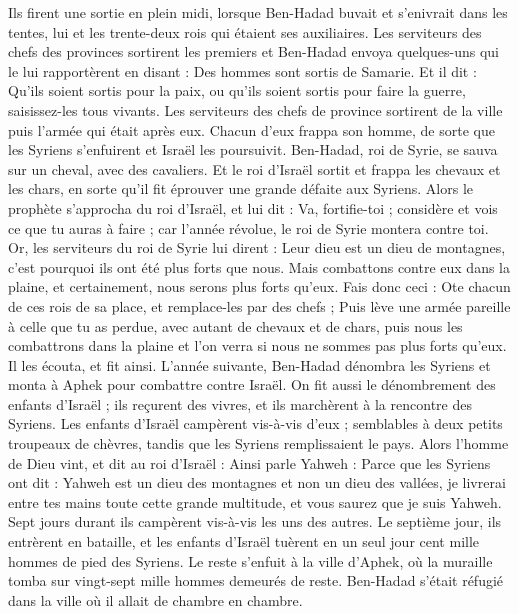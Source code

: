 \begin{multicols}{2}
Ils firent une sortie en plein midi, lorsque Ben-Hadad buvait et s'enivrait dans les tentes, lui et les trente-deux rois qui étaient ses auxiliaires.
Les serviteurs des chefs des provinces sortirent les premiers et Ben-Hadad envoya quelques-uns qui le lui rapportèrent en disant : Des hommes sont sortis de Samarie.
Et il dit : Qu’ils soient sortis pour la paix, ou qu'ils soient sortis pour faire la guerre, saisissez-les tous vivants.
Les serviteurs des chefs de province sortirent de la ville puis l'armée qui était après eux.
Chacun d'eux frappa son homme, de sorte que les Syriens s'enfuirent et Israël les poursuivit. Ben-Hadad, roi de Syrie, se sauva sur un cheval, avec des cavaliers.
Et le roi d'Israël sortit et frappa les chevaux et les chars, en sorte qu'il fit éprouver une grande défaite aux Syriens.
Alors le prophète s’approcha du roi d'Israël, et lui dit : Va, fortifie-toi ; considère et vois ce que tu auras à faire ; car l’année révolue, le roi de Syrie montera contre toi.
Or, les serviteurs du roi de Syrie lui dirent : Leur dieu est un dieu de montagnes, c'est pourquoi ils ont été plus forts que nous. Mais combattons contre eux dans la plaine, et certainement, nous serons plus forts qu'eux.
Fais donc ceci : Ote chacun de ces rois de sa place, et remplace-les par des chefs ;
Puis lève une armée pareille à celle que tu as perdue, avec autant de chevaux et de chars, puis nous les combattrons dans la plaine et l’on verra si nous ne sommes pas plus forts qu'eux. Il les écouta, et fit ainsi.
L’année suivante, Ben-Hadad dénombra les Syriens et monta à Aphek pour combattre contre Israël.
On fit aussi le dénombrement des enfants d'Israël ; ils reçurent des vivres, et ils marchèrent à la rencontre des Syriens. Les enfants d'Israël campèrent vis-à-vis d'eux ; semblables à deux petits troupeaux de chèvres, tandis que les Syriens remplissaient le pays.
Alors l'homme de Dieu vint, et dit au roi d'Israël : Ainsi parle Yahweh : Parce que les Syriens ont dit : Yahweh est un dieu des montagnes et non un dieu des vallées, je livrerai entre tes mains toute cette grande multitude, et vous saurez que je suis Yahweh.
Sept jours durant ils campèrent vis-à-vis les uns des autres. Le septième jour, ils entrèrent en bataille, et les enfants d'Israël tuèrent en un seul jour cent mille hommes de pied des Syriens.
Le reste s'enfuit à la ville d'Aphek, où la muraille tomba sur vingt-sept mille hommes demeurés de reste. Ben-Hadad s'était réfugié dans la ville où il allait de chambre en chambre.

\end{multicols}
